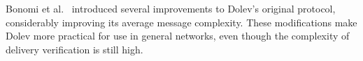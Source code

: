 Bonomi et al.~\cite{bonomi2019multihop} introduced several improvements to Dolev's original protocol, considerably improving its average message complexity. These modifications make Dolev more practical for use in general networks, even though the complexity of delivery verification is still high. 

